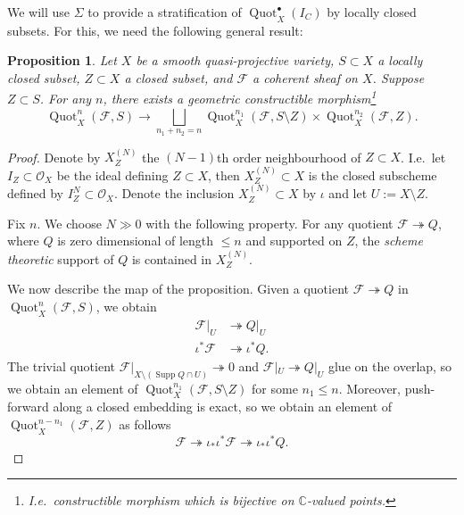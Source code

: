 \documentclass[12pt]{amsart}
\newtheorem{proposition}[theorem]{Proposition}
\theoremstyle{definition}
\newcommand{\CC} {\mathbb{C}}          %
\renewcommand{\O}{\mathcal{O}}
\newcommand{\Quot}{\operatorname{Quot}}
\newcommand{\Supp}{\operatorname{Supp}}
\newcommand{\F}{\mathcal{F}}
\begin{document}
We will use $\Sigma$ to provide a stratification of $\Quot_X^{\bullet}(I_{C})$ 
by locally closed subsets. For this, we need the following general result:
\begin{proposition} \label{keyprop}
Let $X$ be a smooth quasi-projective variety, $S \subset X$ a locally closed subset, 
$Z \subset X$ a closed subset, and $\F$ a coherent sheaf on $X$. Suppose 
$Z \subset S$. For any $n$, there exists a geometric constructible 
morphism\footnote{I.e.~constructible morphism which is bijective 
on $\CC$-valued points.}
\[
\Quot_X^n(\F,S) \longrightarrow \bigsqcup_{n_1+n_2=n} 
\Quot^{n_1}_X(\F,S \setminus Z) \times \Quot^{n_2}_X(\F,Z).
\]
\end{proposition}
\begin{proof}
Denote by $X_Z^{(N)}$ the $(N-1)$th order neighbourhood of $Z \subset X$. 
I.e.~let $I_Z \subset \O_X$ be the ideal defining $Z \subset X$, then 
$X_Z^{(N)} \subset X$ is the closed subscheme defined by 
$I_Z^N \subset \O_X$. Denote the inclusion $X_Z^{(N)} \subset X$ 
by $\iota$ and let $U:=X \setminus Z$.

Fix $n$. We choose $N \gg 0$ with the following property. For any 
quotient $\F \twoheadrightarrow Q$, where $Q$ is zero dimensional 
of length $\leq n$ and supported on $Z$, the \emph{scheme theoretic} 
support of $Q$ is contained in $X_Z^{(N)}$.

We now describe the map of the proposition. Given a quotient 
$\F \twoheadrightarrow Q$ in $\Quot_X^n(\F,S)$, we obtain
\begin{align*}
\F|_U &\twoheadrightarrow Q|_U \\
\iota^* \F &\twoheadrightarrow \iota^* Q.
\end{align*}
The trivial quotient $\F|_{X \setminus (\Supp Q \cap U)} \twoheadrightarrow 0$ 
and $\F|_U \twoheadrightarrow Q|_U$ glue on the overlap, so we 
obtain an element of $\Quot^{n_1}_X(\F,S \setminus Z)$ for some 
$n_1 \leq n$. Moreover, push-forward along a closed embedding 
is exact, so we obtain an element of $\Quot^{n-n_1}_X(\F,Z)$ 
as follows
\[
\F \twoheadrightarrow \iota_* \iota^* \F \twoheadrightarrow \iota_* \iota^* Q.
\]



\end{proof}
\end{document}
